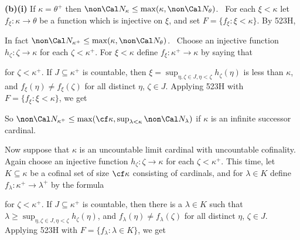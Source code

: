 {\medskip

{\bf (b)(i)} If $\kappa=\theta^+$ then
$\non\Cal N_{\kappa}\le\max(\kappa,\non\Cal N_{\theta})$.
\Prf\ For each $\xi<\kappa$ let $f_{\xi}:\kappa\to\theta$ be a function
which is injective on $\xi$, and set $F=\{f_{\xi}:\xi<\kappa\}$.   By 523H,


\noindent In fact
$\non\Cal N_{\kappa^+}\le\max(\kappa,\non\Cal N_{\theta})$.   \Prf\
Choose an injective function $h_{\zeta}:\zeta\to\kappa$ for each
$\zeta<\kappa^+$.   For $\xi<\kappa$ define
$f_{\xi}:\kappa^+\to\kappa$ by saying that


\noindent for $\zeta<\kappa^+$.   If
$J\subseteq\kappa^+$ is countable, then
$\xi=\sup_{\eta,\zeta\in J,\eta<\zeta}h_{\zeta}(\eta)$ is less than
$\kappa$, and
$f_{\xi}(\eta)\ne f_{\xi}(\zeta)$ for all distinct $\eta$, $\zeta\in J$.
Applying 523H with $F=\{f_{\xi}:\xi<\kappa\}$, we get


So $\non\Cal N_{\kappa^+}
\le\max(\cf\kappa,\sup_{\lambda<\kappa}\non\Cal N_{\lambda})$ if $\kappa$
is an infinite successor cardinal.

\medskip

 Now suppose that $\kappa$ is an uncountable limit cardinal
with uncountable cofinality.   Again choose an injective function
$h_{\zeta}:\zeta\to\kappa$ for each $\zeta<\kappa^+$.
This time, let $K\subseteq\kappa$ be a cofinal set of size
$\cf\kappa$ consisting of cardinals, and for $\lambda\in K$ define
$f_{\lambda}:\kappa^+\to\lambda^+$ by the formula


\noindent for $\zeta<\kappa^+$.   If
$J\subseteq\kappa^+$ is countable, then there is a $\lambda\in K$ such that
$\lambda\ge\sup_{\eta,\zeta\in J,\eta<\zeta}h_{\zeta}(\eta)$, and
$f_{\lambda}(\eta)\ne f_{\lambda}(\zeta)$ for all distinct
$\eta$, $\zeta\in J$.
Applying 523H with $F=\{f_{\lambda}:\lambda\in K\}$, we get

}%

